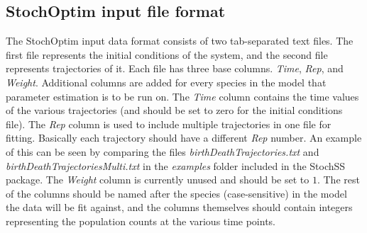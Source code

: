 \subsection{StochOptim input file format}
The StochOptim input data format consists of two tab-separated text files.
The first file represents the initial conditions of the system, and the second file represents trajectories of it.
Each file has three base columns. \textit{Time}, \textit{Rep}, and \textit{Weight}. Additional columns are added for every species in the model that parameter estimation is to be run on. The \textit{Time} column contains the time values of the various trajectories (and should be set to zero for the initial conditions file). The \textit{Rep} column is used to include multiple trajectories in one file for fitting. Basically each trajectory should have a different \textit{Rep} number. An example of this can be seen by comparing the files \textit{birthDeathTrajectories.txt} and \textit{birthDeathTrajectoriesMulti.txt} in the \textit{examples} folder included in the StochSS package. The \textit{Weight} column is currently unused and should be set to $1$. The rest of the columns should be named after the species (case-sensitive) in the model the data will be fit against, and the columns themselves should contain integers representing the population counts at the various time points.

